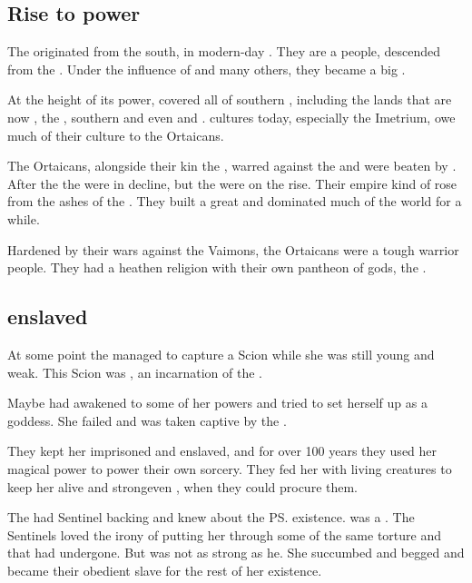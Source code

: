 \subsection{Rise to power}
The \Ortaicans{} originated from the south, in modern-day \Durcac. 
They are a \Tassian{} people, descended from the \Masthenon. 
Under the influence of  and many others, they became a big \bacconate. 

At the height of its power, \Ortaica{} covered all of southern , including the lands that are now {\Durcac}, the , southern  and even  and . 
\Scathaese{} cultures today, especially the Imetrium, owe much of their culture to the Ortaicans. 

The Ortaicans, alongside their kin the \Shurcos, warred against the  and were beaten by . 
After the  the \Shurco{} were in decline, but the \Ortaicans{} were on the rise. 
Their empire kind of rose from the ashes of the \Shurco. 
They built a great  and dominated much of the world for a while. 

Hardened by their wars against the Vaimons, the Ortaicans were a tough warrior people. 
They had a heathen religion with their own pantheon of gods, the .  





\subsection{\Ishicah{} enslaved}
At some point the \rethyaxes{} managed to capture a Scion while she was still young and weak. 
This Scion was , an incarnation of the \Malach{} . 

Maybe \Ishicah{} had awakened to some of her powers and tried to set herself up as a goddess. 
She failed and was taken captive by the \Ortaicans. 

They kept her imprisoned and enslaved, and for over 100 years they used her magical power to power their own sorcery. 
They fed her with living creatures to keep her alive and strong\dash even \resphain, when they could procure them. 

The \rethyaxes{} had Sentinel backing and knew about the \ps{\resphain}{} existence. 
\Ishicah{} was a \sathariah{}. 
The Sentinels loved the irony of putting her through some of the same torture and  that \Nexagglachel{} had undergone. 
But \Ishicah{} was not as strong as he. 
She succumbed and begged and became their obedient slave for the rest of her existence. 

